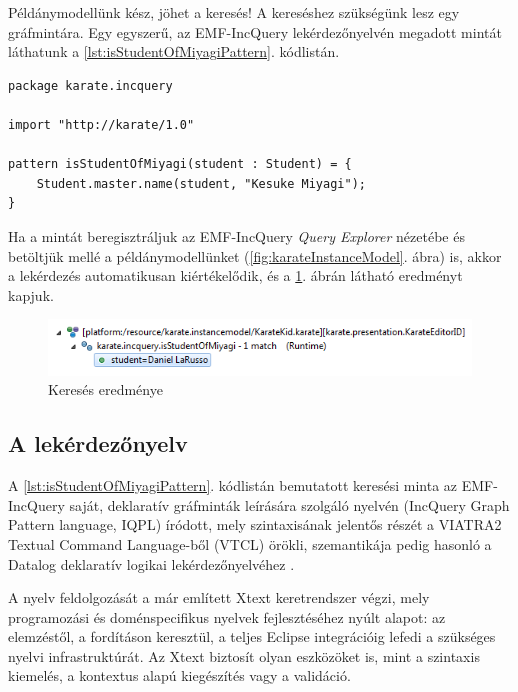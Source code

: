 Példánymodellünk kész, jöhet a keresés!
A kereséshez szükségünk lesz egy gráfmintára.
Egy egyszerű, az EMF-IncQuery lekérdezőnyelvén megadott mintát láthatunk a \ref{lst:isStudentOfMiyagiPattern}. kódlistán.
%
\begin{lstlisting}[float,floatplacement=htb,caption=isStudentOfMiyagi gráfminta a tárgynyelven,label=lst:isStudentOfMiyagiPattern]
package karate.incquery

import "http://karate/1.0"

pattern isStudentOfMiyagi(student : Student) = {
    Student.master.name(student, "Kesuke Miyagi");
}
\end{lstlisting}
%
Ha a mintát beregisztráljuk az EMF-IncQuery \emph{Query Explorer} nézetébe és betöltjük mellé a példánymodellünket (\ref{fig:karateInstanceModel}. ábra) is, akkor a lekérdezés automatikusan kiértékelődik, és a \ref{fig:karateQueryResult}. ábrán látható eredményt kapjuk.
%
\begin{figure}[htb]
\centering
\includegraphics[width=\textwidth]{figures/karate-query-result.png}
\caption{Keresés eredménye}
\label{fig:karateQueryResult}
\end{figure}

\subsection{A lekérdezőnyelv}

A \ref{lst:isStudentOfMiyagiPattern}. kódlistán bemutatott keresési minta az EMF-IncQuery saját, deklaratív gráfminták leírására szolgáló nyelvén (IncQuery Graph Pattern language, IQPL) íródott, mely szintaxisának jelentős részét a VIATRA2 Textual Command Language-ből (VTCL) örökli, szemantikája pedig hasonló a Datalog deklaratív logikai lekérdezőnyelvéhez \cite{Ceri:1989:YAW:627272.627357}.

A nyelv feldolgozását a már említett Xtext keretrendszer végzi, mely programozási és doménspecifikus nyelvek fejlesztéséhez nyúlt alapot: az elemzéstől, a fordításon keresztül, a teljes Eclipse integrációig lefedi a szükséges nyelvi infrastruktúrát.
Az Xtext biztosít olyan eszközöket is, mint a szintaxis kiemelés, a kontextus alapú kiegészítés vagy a validáció.

